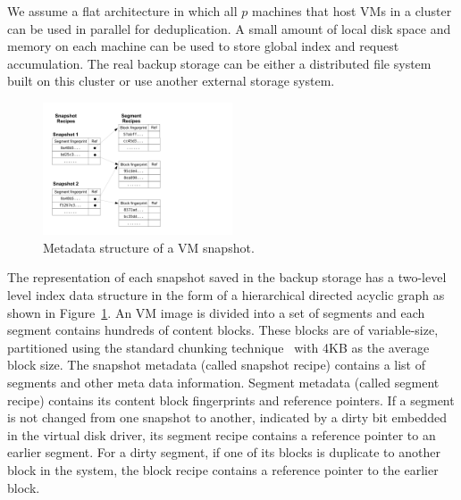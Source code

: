 We assume a flat architecture in which  all $p$ machines that host VMs in a cluster can 
be used in parallel for deduplication. 
A small amount of local disk space and memory on each machine can be used 
to store global index and request accumulation.
The real backup storage can be either a distributed file system built on
this cluster  or use another  external storage system. 



\begin{figure}
\centering
\includegraphics[width=0.5\textwidth]{snapshotdata.pdf}
\caption{ Metadata structure of a VM snapshot.}
\label{fig:snapshot}
\end{figure}

The representation of each snapshot saved in the backup storage
has a two-level level index data structure in the form of a hierarchical
directed acyclic graph as shown in Figure~\ref{fig:snapshot}.
An VM image is divided into a set of segments and each  segment contains hundreds of content blocks. 
These blocks are of variable-size, partitioned using
the standard chunking technique~\cite{similar94} with 4KB as the average block size. 
The snapshot metadata (called snapshot recipe) contains a list of segments and other meta data information.
Segment metadata (called segment recipe) contains its  content block fingerprints and reference pointers. 
If a segment is not changed from one snapshot to another, indicated by a dirty bit embedded in the virtual disk driver, 
its segment recipe contains a reference pointer to an earlier segment.
For a dirty segment, if one of its blocks is duplicate to another block in the system,  
the block recipe contains a reference pointer to the earlier block.





